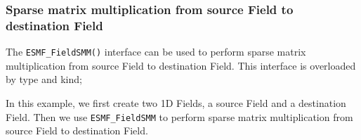  
\setlength{\oldparskip}{\parskip}
\setlength{\parskip}{1.5ex}
\setlength{\oldparindent}{\parindent}
\setlength{\parindent}{0pt}
\setlength{\oldbaselineskip}{\baselineskip}
\setlength{\baselineskip}{11pt}
 
\def\bv{\begin{verbatim}}
\def\ev{\end{verbatim}}
\def\be{\begin{equation}}
\def\ee{\end{equation}}
\def\bea{\begin{eqnarray}}
\def\eea{\end{eqnarray}}
\def\bi{\begin{itemize}}
\def\ei{\end{itemize}}
\def\bn{\begin{enumerate}}
\def\en{\end{enumerate}}
\def\bd{\begin{description}}
\def\ed{\end{description}}
\def\({\left (}
\def\){\right )}
\def\[{\left [}
\def\]{\right ]}
\def\<{\left  \langle}
\def\>{\right \rangle}
\def\cI{{\cal I}}
\def\diag{\mathop{\rm diag}}
\def\tr{\mathop{\rm tr}}


 

   \subsubsection{Sparse matrix multiplication from source Field to destination Field}
   \label{sec:field:usage:smm_1dptr}
  
   The {\tt ESMF\_FieldSMM()} interface can be used to perform sparse matrix multiplication
   from
   source Field to destination Field. This interface is overloaded by type and kind;
  
   In this example, we first create two 1D Fields, a source Field and a destination
   Field. Then we use {\tt ESMF\_FieldSMM} to
   perform sparse matrix multiplication from source Field to destination Field.
  

